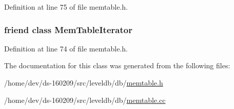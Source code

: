 Definition at line 75 of file memtable.\+h.

\hypertarget{classleveldb_1_1_mem_table_ad6cb602bccb9af617c8cb348ae693d4a}{}
\subsubsection[{Mem\+Table\+Iterator}]{\setlength{\rightskip}{0pt plus 5cm}friend class {\bf Mem\+Table\+Iterator}\hspace{0.3cm}{\ttfamily [friend]}}\label{classleveldb_1_1_mem_table_ad6cb602bccb9af617c8cb348ae693d4a}


Definition at line 74 of file memtable.\+h.



The documentation for this class was generated from the following files\+:\begin{DoxyCompactItemize}
\item 
/home/dev/ds-\/160209/src/leveldb/db/\hyperlink{memtable_8h}{memtable.\+h}\item 
/home/dev/ds-\/160209/src/leveldb/db/\hyperlink{memtable_8cc}{memtable.\+cc}\end{DoxyCompactItemize}
